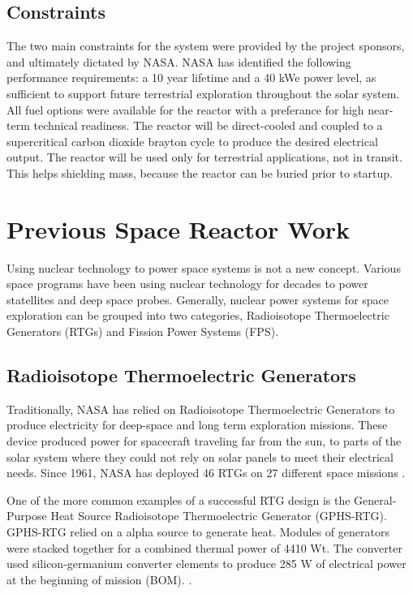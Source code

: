 \subsection{Constraints}
The two main constraints for the system were provided by the project sponsors,
and ultimately dictated by NASA. NASA has identified the following performance
requirements: a 10 year lifetime and a 40 kWe power level, as sufficient to
support future terrestrial exploration throughout the solar system. All fuel
options were available for the reactor with a preferance for high near-term
technical readiness. The reactor will be direct-cooled and coupled to a
supercritical carbon dioxide brayton cycle to produce the desired electrical
output. The reactor will be used only for terrestrial applications, not in
transit. This helps shielding mass, because the reactor can be buried prior to
startup.

\section{Previous Space Reactor Work}
Using nuclear technology to power space systems is not a new concept. Various
space programs have been using nuclear technology for decades to power
statellites and deep space probes. Generally, nuclear power systems for space
exploration can be grouped into two categories, Radioisotope Thermoelectric
Generators (RTGs) and Fission Power Systems (FPS). 

\subsection{Radioisotope Thermoelectric Generators}
Traditionally, NASA has relied on Radioisotope Thermoelectric Generators to
produce electricity for deep-space and long term exploration missions. These
device produced power for spacecraft traveling far from the sun, to parts of the
solar system where they could not rely on solar panels to meet their electrical
needs. Since 1961, NASA has deployed 46 RTGs on 27 different space missions
\citep{mmrtg_fact}.

One of the more common examples of a successful RTG design is the
General-Purpose Heat Source Radioisotope Thermoelectric Generator (GPHS-RTG).
GPHS-RTG relied on a \pu alpha source to generate heat. Modules of \pu
generators were stacked together for a combined thermal power of 4410 Wt. The
converter used silicon-germanium converter elements to produce 285 W of
electrical power at the beginning of mission (BOM).
\citep{bennett_mission_2006}. 

